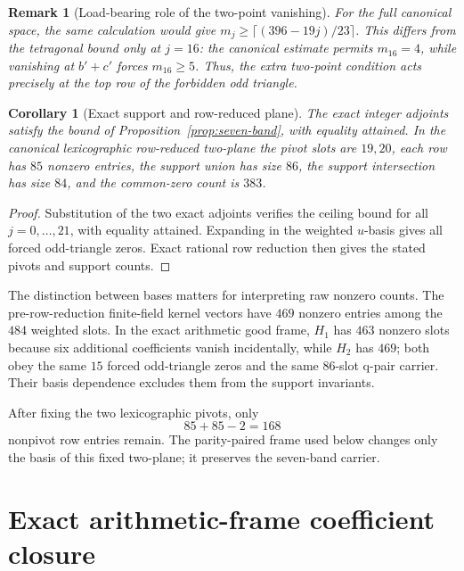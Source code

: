 \documentclass[11pt]{article}
\newtheorem{corollary}[theorem]{Corollary}
\newtheorem{remark}[theorem]{Remark}
\begin{document}
\begin{remark}[Load-bearing role of the two-point vanishing]\label{rem:band-law-twopoint}
For the full canonical space, the same calculation would give
$m_j\ge\lceil(396-19j)/23\rceil$.  This differs from the tetragonal
bound only at $j=16$: the canonical estimate permits $m_{16}=4$, while
vanishing at $b'+c'$ forces $m_{16}\ge5$.  Thus, the extra two-point
condition acts precisely at the top row of the forbidden odd triangle.
\end{remark}

\begin{corollary}[Exact support and row-reduced plane]\label{cor:seven-band-exact}
The exact integer adjoints satisfy the bound of
Proposition~\ref{prop:seven-band}, with equality attained.  In the
canonical lexicographic row-reduced two-plane the pivot slots are
$19,20$, each row has $85$ nonzero entries, the support union has size
$86$, the support intersection has size $84$, and the common-zero count
is $383$.
\end{corollary}

\begin{proof}
Substitution of the two exact adjoints verifies the ceiling bound for all $j=0,\ldots,21$, with equality attained.  Expanding in the weighted $u$-basis gives all forced odd-triangle zeros.  Exact rational row reduction then gives the stated pivots and support counts.
\end{proof}

The distinction between bases matters for interpreting raw nonzero counts.  The pre-row-reduction finite-field kernel vectors have $469$ nonzero entries among the $484$ weighted slots.  In the exact arithmetic good frame, $H_1$ has $463$ nonzero slots because six additional coefficients vanish incidentally, while $H_2$ has $469$; both obey the same $15$ forced odd-triangle zeros and the same $86$-slot q-pair carrier.  Their basis dependence excludes them from the support invariants.

After fixing the two lexicographic pivots, only
\[
 85+85-2=168
\]
nonpivot row entries remain.  The parity-paired frame used below changes only the basis of this fixed two-plane; it preserves the seven-band carrier.

\section{Exact arithmetic-frame coefficient closure}\label{sec:exact-closure}
\end{document}
